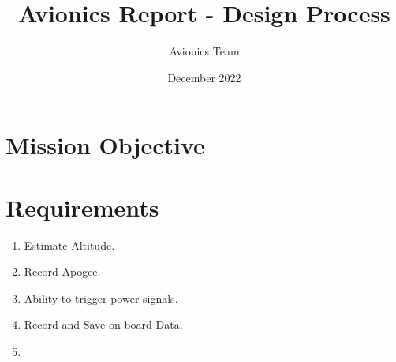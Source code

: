 \documentclass{article}
\title{Avionics Report - Design Process}
\author{Avionics Team}
\date{December 2022}
\begin{document}
\maketitle

\section{Mission Objective}

\section{Requirements}

\begin{enumerate}
    \item Estimate Altitude. 
    \item Record Apogee.
    \item Ability to trigger power signals.
    \item Record and Save on-board Data.
    \item 
\end{enumerate}
\end{document}

